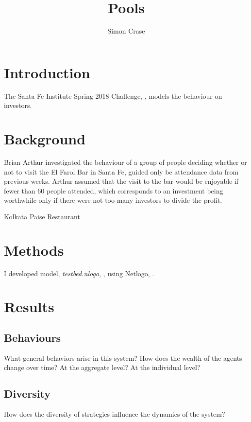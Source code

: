 \documentclass[]{article}
\title{Pools}
\author{Simon Crase}
\begin{document}
\maketitle

\begin{abstract}

\end{abstract}

\section{Introduction}
The Santa Fe Institute Spring 2018 Challenge, \cite{Challenge:2018}, models the behaviour on investors.

\section{Background}


Brian Arthur \cite{Arthur:1992} investigated the behaviour of a group of people deciding whether or not to visit the El Farol Bar in Santa Fe, guided only be attendance data from previous weeks. Arthur assumed that the visit to the bar would be enjoyable if fewer than 60 people attended, which corresponds to an investment being worthwhile only if there were not too many investors to divide the profit.

\cite{Fogel:1999}

\cite{Rand:2007}

Kolkata Paise Restaurant \cite{Chakrabarti:2007}
\cite{Chakrabarti:2009}

\section{Methods}
I developed model, \emph{testbed.nlogo}, \cite{Github:2018}, using Netlogo, \cite{Wilensky:1999}.

\section{Results}

\subsection{Behaviours}What general behaviors arise in this system?  How does the wealth of the agents change over time? At the aggregate level? At the individual level?
\subsection{Diversity}How does the diversity of strategies influence the dynamics of the system?
\end{document}
